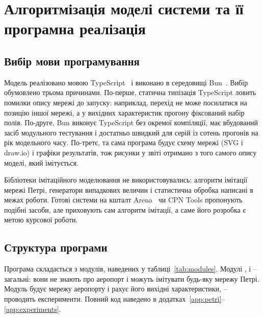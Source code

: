 \section{Алгоритмізація моделі системи та її програмна реалізація}

\subsection{Вибір мови програмування}

Модель реалізовано мовою TypeScript~\cite{typescript} і виконано в середовищі Bun~\cite{bun}. Вибір обумовлено трьома причинами. По-перше, статична типізація TypeScript ловить помилки опису мережі до запуску: наприклад, перехід не може посилатися на позицію іншої мережі, а у вихідних характеристик прогону фіксований набір полів. По-друге, Bun виконує TypeScript без окремої компіляції, має вбудований засіб модульного тестування і достатньо швидкий для серій із сотень прогонів на рік модельного часу. По-третє, та сама програма будує схему мережі (SVG і draw.io) і графіки результатів, тож рисунки у звіті отримано з того самого опису моделі, який імітується.

Бібліотеки імітаційного моделювання не використовувались: алгоритм імітації мережі Петрі, генератори випадкових величин і статистична обробка написані в межах роботи. Готові системи на кшталт Arena~\cite{kelton2024} чи CPN Tools пропонують подібні засоби, але приховують сам алгоритм імітації, а саме його розробка є метою курсової роботи.

\subsection{Структура програми}

Програма складається з модулів, наведених у таблиці~\ref{tab:modules}. Модулі ,  і  -- загальні: вони не знають про аеропорт і можуть імітувати будь-яку мережу Петрі. Модуль  будує мережу аеропорту і рахує його вихідні характеристики,  -- проводить експерименти. Повний код наведено в додатках~\ref{app:petri}--\ref{app:experiments}.

